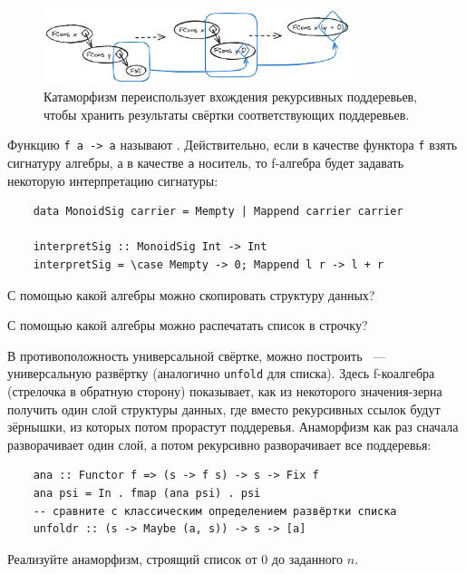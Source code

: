 \begin{figure}
    \centering
    \includegraphics[width=0.8\textwidth]{figs/cataStep.excalidraw}
    \caption{Катаморфизм переиспользует вхождения рекурсивных поддеревьев, чтобы хранить результаты свёртки соответствующих поддеревьев.}
    \label{fig:cata-step}
\end{figure}

Функцию \texttt{f a -> a} называют .
Действительно, если в качестве функтора \texttt{f} взять сигнатуру алгебры, а в качестве \texttt{a} носитель, то f-алгебра будет задавать некоторую интерпретацию сигнатуры:
\begin{verbatim}
    data MonoidSig carrier = Mempty | Mappend carrier carrier

    interpretSig :: MonoidSig Int -> Int
    interpretSig = \case Mempty -> 0; Mappend l r -> l + r
\end{verbatim}

\begin{task}
    С помощью какой алгебры можно скопировать структуру данных?
\end{task}

\begin{task}
    С помощью какой алгебры можно распечатать список в строчку?
\end{task}

В противоположность универсальной свёртке, можно построить ~--- универсальную развёртку (аналогично \texttt{unfold} для списка).
Здесь f-коалгебра (стрелочка в обратную сторону) показывает, как из некоторого значения-зерна получить один слой структуры данных, где вместо рекурсивных ссылок будут зёрнышки, из которых потом прорастут поддеревья.
Анаморфизм как раз сначала разворачивает один слой, а потом рекурсивно разворачивает все поддеревья:
\begin{verbatim}
    ana :: Functor f => (s -> f s) -> s -> Fix f
    ana psi = In . fmap (ana psi) . psi
    -- сравните с классическим определением развёртки списка
    unfoldr :: (s -> Maybe (a, s)) -> s -> [a]
\end{verbatim}

\begin{task}
    Реализуйте анаморфизм, строящий список от $0$ до заданного $n$.
\end{task}


